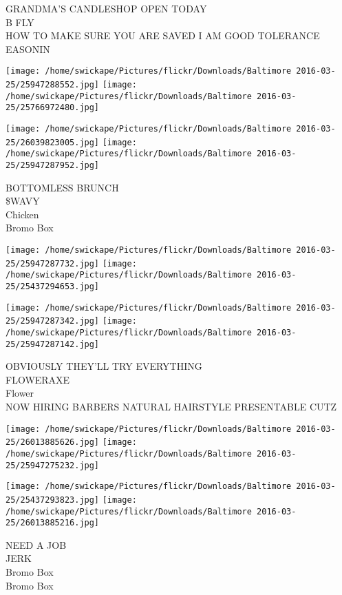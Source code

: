 \documentclass[10pt,letterpaper]{article}
\begin{document}
GRANDMA'S CANDLESHOP OPEN TODAY\\
B FLY\\
HOW TO MAKE SURE YOU ARE SAVED I AM GOOD TOLERANCE\\
EASONIN\\
\pagebreak

\texttt{[image: /home/swickape/Pictures/flickr/Downloads/Baltimore 2016-03-25/25947288552.jpg]}
\texttt{[image: /home/swickape/Pictures/flickr/Downloads/Baltimore 2016-03-25/25766972480.jpg]}

\texttt{[image: /home/swickape/Pictures/flickr/Downloads/Baltimore 2016-03-25/26039823005.jpg]}
\texttt{[image: /home/swickape/Pictures/flickr/Downloads/Baltimore 2016-03-25/25947287952.jpg]}

BOTTOMLESS BRUNCH\\
\$WAVY\\
Chicken\\
Bromo Box\\
\pagebreak

\texttt{[image: /home/swickape/Pictures/flickr/Downloads/Baltimore 2016-03-25/25947287732.jpg]}
\texttt{[image: /home/swickape/Pictures/flickr/Downloads/Baltimore 2016-03-25/25437294653.jpg]}

\texttt{[image: /home/swickape/Pictures/flickr/Downloads/Baltimore 2016-03-25/25947287342.jpg]}
\texttt{[image: /home/swickape/Pictures/flickr/Downloads/Baltimore 2016-03-25/25947287142.jpg]}

OBVIOUSLY THEY'LL TRY EVERYTHING\\
FLOWERAXE\\
Flower\\
NOW HIRING BARBERS NATURAL HAIRSTYLE PRESENTABLE CUTZ\\
\pagebreak

\texttt{[image: /home/swickape/Pictures/flickr/Downloads/Baltimore 2016-03-25/26013885626.jpg]}
\texttt{[image: /home/swickape/Pictures/flickr/Downloads/Baltimore 2016-03-25/25947275232.jpg]}

\texttt{[image: /home/swickape/Pictures/flickr/Downloads/Baltimore 2016-03-25/25437293823.jpg]}
\texttt{[image: /home/swickape/Pictures/flickr/Downloads/Baltimore 2016-03-25/26013885216.jpg]}

NEED A JOB\\
JERK\\
Bromo Box\\
Bromo Box\\
\pagebreak
\end{document}
